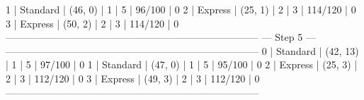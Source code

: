  1     | Standard  | (46, 0)     | 1       | 5          | 96/100    | 0
 2     | Express   | (25, 1)     | 2       | 3          | 114/120   | 0
 3     | Express   | (50, 2)     | 2       | 3          | 114/120   | 0
-----------------------------------------------------------------------------
                                --- Step 5 ---
-----------------------------------------------------------------------------
 0     | Standard  | (42, 13)    | 1       | 5          | 97/100    | 0
 1     | Standard  | (47, 0)     | 1       | 5          | 95/100    | 0
 2     | Express   | (25, 3)     | 2       | 3          | 112/120   | 0
 3     | Express   | (49, 3)     | 2       | 3          | 112/120   | 0
-----------------------------------------------------------------------------